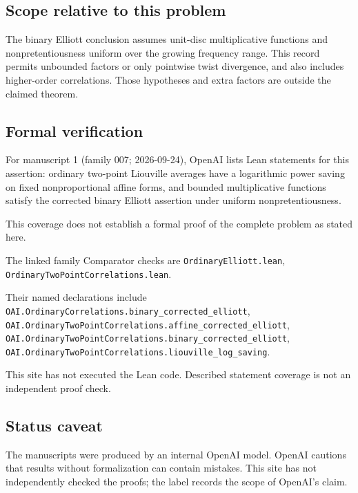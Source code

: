 \documentclass[11pt]{article}
\begin{document}
\subsection{Scope relative to this problem}
The binary Elliott conclusion assumes unit-disc multiplicative functions and nonpretentiousness uniform over the growing frequency range. This record permits unbounded factors or only pointwise twist divergence, and also includes higher-order correlations. Those hypotheses and extra factors are outside the claimed theorem.

\subsection{Formal verification}
For manuscript 1 (family 007; 2026-09-24), OpenAI lists Lean statements for this assertion: ordinary two-point Liouville averages have a logarithmic power saving on fixed nonproportional affine forms, and bounded multiplicative functions satisfy the corrected binary Elliott assertion under uniform nonpretentiousness.

This coverage does not establish a formal proof of the complete problem as stated here.

The linked family Comparator checks are \texttt{OrdinaryElliott.lean}, \texttt{OrdinaryTwoPointCorrelations.lean}.

Their named declarations include \texttt{OAI.OrdinaryCorrelations.binary\_corrected\_elliott}, \texttt{OAI.OrdinaryTwoPointCorrelations.affine\_corrected\_elliott}, \texttt{OAI.OrdinaryTwoPointCorrelations.binary\_corrected\_elliott}, \texttt{OAI.OrdinaryTwoPointCorrelations.liouville\_log\_saving}.

This site has not executed the Lean code. Described statement coverage is not an independent proof check.

\subsection{Status caveat}
The manuscripts were produced by an internal OpenAI model. OpenAI cautions that results without formalization can contain mistakes. This site has not independently checked the proofs; the label records the scope of OpenAI's claim.
\end{document}
